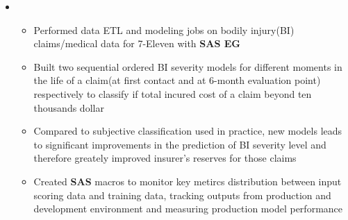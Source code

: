 \documentclass[11pt,a4paper,sans]{moderncv}        %
\begin{document}
\begin{itemize}
	\vspace{4pt}

	\item{
		{\vspace{3pt}
			\begin{itemize}
				\item Performed data ETL and modeling jobs on bodily injury(BI) claims/medical data for 7-Eleven with \textbf{SAS EG}
				\item Built two sequential ordered BI severity models for different moments in the life of a claim(at first contact and at 6-month evaluation point) respectively to classify if total incured cost of a claim beyond ten thousands dollar 
				\item Compared to subjective classification used in practice, new models leads to significant improvements in the prediction of BI severity level and therefore greately improved insurer's reserves for those claims
				\item Created \textbf{SAS} macros to monitor key metircs distribution between input scoring data and training data, tracking outputs from production and development environment and measuring production model performance 
		    \end{itemize}}}

	\vspace{4pt}


\end{itemize}
\end{document}
